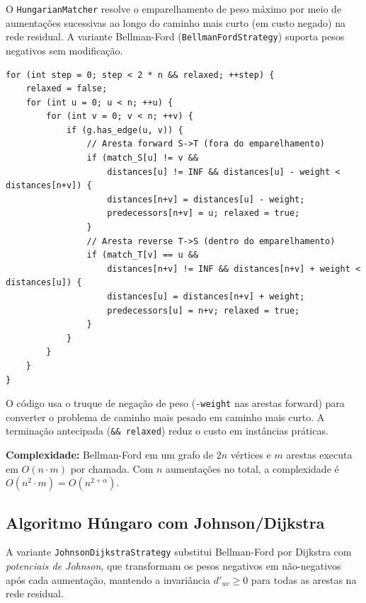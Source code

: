 \documentclass{infufrgs}
\begin{document}
O \texttt{HungarianMatcher} resolve o emparelhamento de peso máximo por meio de aumentações sucessivas ao longo do caminho mais curto (em custo negado) na rede residual. A variante Bellman-Ford (\texttt{BellmanFordStrategy}) suporta pesos negativos sem modificação.

\begin{lstlisting}[caption={Laço de relaxação de Bellman-Ford (BellmanFordStrategy.cpp)}]
for (int step = 0; step < 2 * n && relaxed; ++step) {
    relaxed = false;
    for (int u = 0; u < n; ++u) {
        for (int v = 0; v < n; ++v) {
            if (g.has_edge(u, v)) {
                // Aresta forward S->T (fora do emparelhamento)
                if (match_S[u] != v &&
                    distances[u] != INF && distances[u] - weight < distances[n+v]) {
                    distances[n+v] = distances[u] - weight;
                    predecessors[n+v] = u; relaxed = true;
                }
                // Aresta reverse T->S (dentro do emparelhamento)
                if (match_T[v] == u &&
                    distances[n+v] != INF && distances[n+v] + weight < distances[u]) {
                    distances[u] = distances[n+v] + weight;
                    predecessors[u] = n+v; relaxed = true;
                }
            }
        }
    }
}
\end{lstlisting}

O código usa o truque de negação de peso (\texttt{-weight} nas arestas forward) para converter o problema de caminho mais pesado em caminho mais curto. A terminação antecipada (\texttt{\&\& relaxed}) reduz o custo em instâncias práticas.

\textbf{Complexidade:} Bellman-Ford em um grafo de $2n$ vértices e $m$ arestas executa em $O(n \cdot m)$ por chamada. Com $n$ aumentações no total, a complexidade é $O(n^2 \cdot m) = O(n^{2+\alpha})$.

\subsection{Algoritmo Húngaro com Johnson/Dijkstra}

A variante \texttt{JohnsonDijkstraStrategy} substitui Bellman-Ford por Dijkstra com \emph{potenciais de Johnson}, que transformam os pesos negativos em não-negativos após cada aumentação, mantendo a invariância $d'_{uv} \ge 0$ para todas as arestas na rede residual.
\end{document}
